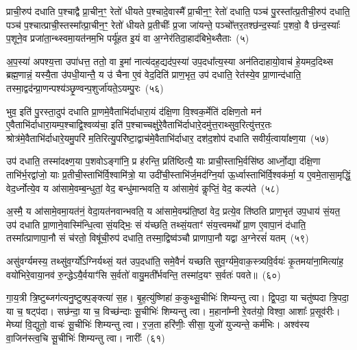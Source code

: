 प्राची॒रुप॑ दधाति प॒श्चाद्वै प्रा॒चीन॒ꣳ॒ रेतो॑ धीयते प॒श्चादे॒वास्मै᳚ प्रा॒चीन॒ꣳ॒ रेतो॑ दधाति॒ पञ्च॑ पु॒रस्ता᳚त्प्र॒तीची॒रुप॑ दधाति॒ पञ्च॑ प॒श्चात्प्राची॒स्तस्मा᳚त्प्रा॒चीन॒ꣳ॒ रेतो॑ धीयते प्र॒तीचीः᳚ प्र॒जा जा॑यन्ते॒ पञ्चो᳚त्तर॒तश्छ॑न्द॒स्याः᳚ प॒शवो॒ वै छ॑न्द॒स्याः᳚ प॒शूने॒व प्रजा॑ता॒न्थ्स्वमा॒यत॑नम॒भि पर्यू॑हत इ॒यं वा अ॒ग्नेर॑तिदा॒हाद॑बिभे॒थ्सैताः~(५)

अ॒प॒स्या॑ अपश्य॒त्ता उपा॑धत्त॒ ततो॒ वा इ॒मां नात्य॑दह॒द्यद॑प॒स्या॑ उप॒दधा᳚त्य॒स्या अन॑तिदाहायो॒वाच॑ हे॒यमद॒दिथ्स ब्रह्म॒णान्नं॒ यस्यै॒ता उ॑पधी॒यान्तै॒ य उ॑ चैना ए॒वं वेद॒दिति॑ प्राण॒भृत॒ उप॑ दधाति॒ रेत॑स्ये॒व प्रा॒णान्द॑धाति॒ तस्मा॒द्वद॑न्प्रा॒णन्पश्य॑ञ्छृ॒ण्वन्प॒शुर्जा॑यते॒\-ऽयम्पु॒रः~(५६)

भुव॒ इति॑ पु॒रस्ता॒दुप॑ दधाति प्रा॒णमे॒वैताभि॑र्दाधारा॒यं द॑क्षि॒णा वि॒श्वक॒र्मेति॑ दक्षिण॒तो मन॑ ए॒वैताभि॑र्दाधारा॒यम्प॒श्चाद्वि॒श्वव्य॑चा॒ इति॑ प॒श्चाच्चक्षु॑रे॒वैताभि॑र्दाधारे॒दमु॑त्त॒राथ्सुव॒रित्यु॑त्तर॒तः श्रोत्र॑मे॒वैताभि॑र्दाधारे॒यमु॒परि॑ म॒तिरित्यु॒परि॑ष्टा॒द्वाच॑मे॒वैताभि॑र्दाधार॒ दश॑द॒शोप॑ दधाति सवीर्य॒त्वाया᳚क्ष्ण॒या~(५७)

उप॑ दधाति॒ तस्मा॑दक्ष्ण॒या प॒शवो\-ऽङ्गा॑नि॒ प्र ह॑रन्ति॒ प्रति॑ष्ठित्यै॒ याः प्राची॒स्ताभि॒र्वसि॑ष्ठ आर्ध्नो॒द्या द॑क्षि॒णा ताभि॑र्भ॒रद्वा॑जो॒ याः प्र॒तीची॒स्ताभि॑र्वि॒श्वामि॑त्रो॒ या उदी॑ची॒स्ताभि॑र्ज॒मद॑ग्नि॒र्या ऊ॒र्ध्वास्ताभि॑र्वि॒श्वक॑र्मा॒ य ए॒वमे॒तासा॒मृद्धिं॒ वेद॒र्ध्नोत्ये॒व य आ॑सामे॒वम्ब॒न्धुतां॒ वेद॒ बन्धु॑मान्भवति॒ य आ॑सामे॒वं कॢप्तिं॒ वेद॒ कल्प॑ते~(५८)

अ॒स्मै॒ य आ॑सामे॒वमा॒यत॑नं॒ वेदा॒यत॑नवान्भवति॒ य आ॑सामे॒वम्प्र॑ति॒ष्ठां वेद॒ प्रत्ये॒व ति॑ष्ठति प्राण॒भृत॑ उप॒धाय॑ सं॒यत॒ उप॑ दधाति प्रा॒णाने॒वास्मि॑न्धि॒त्वा सं॒यद्भिः॒ सं य॑च्छति॒ तथ्सं॒यताꣳ॑ संय॒त्त्वमथो᳚ प्रा॒ण ए॒वापा॒नं द॑धाति॒ तस्मा᳚त्प्राणापा॒नौ सं च॑रतो॒ विषू॑ची॒रुप॑ दधाति॒ तस्मा॒द्विष्व॑ञ्चौ प्राणापा॒नौ यद्वा अ॒ग्नेरसं॑ यतम्~(५९)

असु॑वर्ग्यमस्य॒ तथ्सु॑व॒र्ग्यो᳚\-ऽग्निर्यथ्सं॒ यत॑ उप॒दधा॑ति॒ समे॒वैनं॑ यच्छति सुव॒र्ग्य॑मे॒वाक॒स्त्र्यवि॒र्वयः॑ कृ॒तमया॑ना॒मित्या॑ह॒ वयो॑भिरे॒वाया॒नव॑ रु॒न्द्धे\-ऽयै॒र्वयाꣳ॑सि स॒र्वतो॑ वायु॒मती᳚र्भवन्ति॒ तस्मा॑द॒यꣳ स॒र्वतः॑ पवते॥~(६०)

{\anuvakamend[{प॒श्चादे॒ताः पु॒रो᳚\-ऽक्ष्ण॒या कल्प॒ते\-ऽसं॑ यतं॒ पञ्च॑त्रिꣳशच्च}]}%

गा॒य॒त्री त्रि॒ष्टुब्जग॑त्यनु॒ष्टुक्प॒ङ्क्त्या॑ स॒ह। बृ॒ह॒त्यु॑ष्णिहा॑ क॒कुथ्सू॒चीभिः॑ शिम्यन्तु त्वा। द्वि॒पदा॒ या चतु॑ष्पदा त्रि॒पदा॒ या च॒ षट्प॑दा। सछ॑न्दा॒ या च॒ विच्छ॑न्दाः सू॒चीभिः॑ शिम्यन्तु त्वा। म॒हाना᳚म्नी रे॒वत॑यो॒ विश्वा॒ आशाः᳚ प्र॒सूव॑रीः। मेघ्या॑ वि॒द्युतो॒ वाचः॑ सू॒चीभिः॑ शिम्यन्तु त्वा। र॒ज॒ता हरि॑णीः॒ सीसा॒ युजो॑ युज्यन्ते॒ कर्म॑भिः। अश्व॑स्य वा॒जिन॑स्त्व॒चि सू॒चीभिः॑ शिम्यन्तु त्वा। नारीः᳚~(६१)

